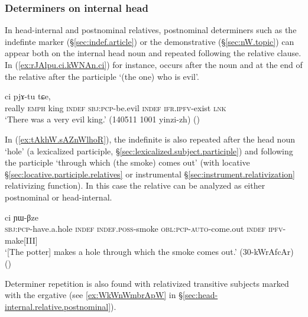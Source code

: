 \subsubsection{Determiners on internal head} \label{sec:head-internal.relative.determiners}
In head-internal and postnominal relatives, postnominal determiners such as the indefinte marker  (§\ref{sec:indef.article}) or the demonstrative  (§\ref{sec:nW.topic}) can appear both on the internal head noun and repeated following the relative clause. In (\ref{ex:rJAlpu.ci.kWNAn.ci}) for instance,  occurs after the noun   and at the end of the relative after the participle  `(the one) who is evil'. 

\begin{exe}
\ex \label{ex:rJAlpu.ci.kWNAn.ci}
 ci pjɤ-tu tɕe, \\
really \textsc{emph} king \textsc{indef} \textsc{sbj}:\textsc{pcp}-be.evil \textsc{indef} \textsc{ifr}.\textsc{ipfv}-exist \textsc{lnk} \\
\glt `There was a very evil king.' (140511 1001 yinzi-zh)
()
 \end{exe} 

In (\ref{ex:tAkhW.sAZnWlhoR}), the indefinite  is also repeated after the head noun  `hole' (a lexicalized participle, §\ref{sec:lexicalized.subject.participle}) and following the participle  `through which (the smoke) comes out' (with locative §\ref{sec:locative.participle.relatives} or instrumental §\ref{sec:instrument.relativization} relativizing function). In this case the relative can be analyzed as either postnominal or head-internal.

\begin{exe}
\ex \label{ex:tAkhW.sAZnWlhoR}
 ci ɲɯ-βze \\
\textsc{sbj}:\textsc{pcp}-have.a.hole \textsc{indef} \textsc{indef}.\textsc{poss}-smoke \textsc{obl}:\textsc{pcp}-\textsc{auto}-come.out \textsc{indef} \textsc{ipfv}-make[III] \\ 
\glt `[The potter] makes a hole through which the smoke comes out.' (30-kWrAfcAr)
()
\end{exe}

Determiner repetition is also found with relativized transitive subjects marked with the ergative (see \ref{ex:WkWnWmbrApW} in §\ref{sec:head-internal.relative.postnominal}).

